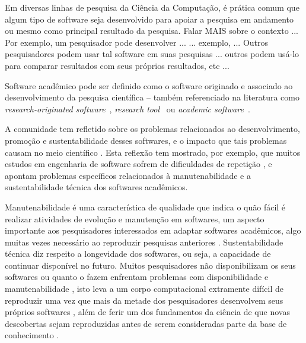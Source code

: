 


Em diversas linhas de pesquisa da Ciência da Computação, é prática comum que algum tipo de software seja desenvolvido para apoiar a pesquisa em andamento ou mesmo como principal resultado da pesquisa.
Falar MAIS sobre o contexto   ... Por exemplo, um pesquisador pode desenvolver ...
... exemplo,  ... Outros pesquisadores podem usar tal software em suas pesquisas ... outros podem usá-lo para comparar resultados com seus próprios resultados, etc ...

Software acadêmico pode ser definido como o software originado e associado ao desenvolvimento da pesquisa científica -- também referenciado na literatura como {\it research-originated software}~\cite{Kon2011}, {\it research tool}~\cite{Portillo12} ou {\it academic software}~\cite{allen2017engineering}. 

A comunidade tem refletido sobre os problemas relacionados ao
desenvolvimento, promoção e sustentabilidade desses softwares, e o
impacto que tais problemas causam no meio científico \cite{allen2017engineering}. Esta
reflexão tem mostrado, por exemplo, que muitos estudos em engenharia de
software sofrem de dificuldades de repetição \cite{Tang2016}, e apontam
problemas específicos relacionados à manutenabilidade e a sustentabilidade
técnica dos softwares acadêmicos.

Manutenabilidade é uma característica de qualidade que indica o quão fácil é
realizar atividades de evolução e manutenção em softwares, um aspecto
importante aos pesquisadores interessados em adaptar softwares acadêmicos, algo
muitas vezes necessário ao reproduzir pesquisas anteriores \cite{Peng2011}.
Sustentabilidade técnica diz respeito a longevidade dos softwares, ou seja, a
capacidade de continuar disponível no futuro. Muitos pesquisadores não
disponibilizam os seus softwares \cite{robles2010replicating,
amann2015software} ou quanto o fazem enfrentam problemas com disponibilidade e
manutenabilidade \cite{Prlic2012}, isto leva a um corpo computacional
extramente difícil de reproduzir uma vez que mais da metade dos pesquisadores
desenvolvem seus próprios softwares \cite{hettrick_2014_14809}, além de ferir um dos
fundamentos da ciência de que novas descobertas sejam reproduzidas antes de
serem consideradas parte da base de conhecimento \cite{Stodden2009}.

